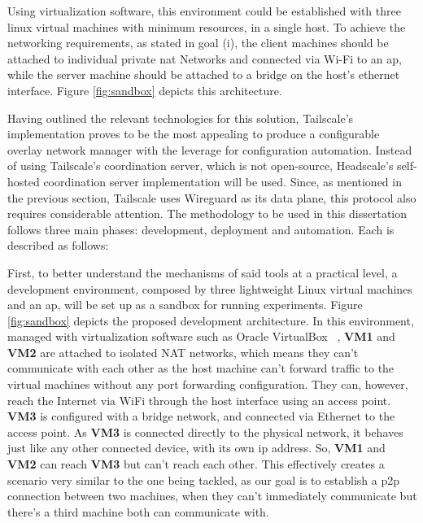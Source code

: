 \documentclass[11pt,twoside,a4paper]{report}
\begin{document}
Using virtualization software, this environment could be established with three linux virtual machines with minimum resources, in a single host. To achieve the networking requirements, as stated in goal (i), the client machines should be attached to individual private \ac{nat} Networks and connected via Wi-Fi to an \ac{ap}, while the server machine should be attached to a bridge on the host's ethernet interface. Figure \ref{fig:sandbox} depicts this architecture.



Having outlined the relevant technologies for this solution, Tailscale's implementation proves to be the most appealing to produce a configurable overlay network manager with the leverage for configuration automation. Instead of using Tailscale's coordination server, which is not open-source, Headscale's self-hosted coordination server implementation will be used. Since, as mentioned in the previous section, Tailscale uses Wireguard as its data plane, this protocol also requires considerable attention. The methodology to be used in this dissertation follows three main phases: development, deployment and automation. Each is described as follows:

First, to better understand the mechanisms of said tools at a practical level, a development environment, composed by three lightweight Linux virtual machines and an \ac{ap}, will be set up as a sandbox for running experiments. Figure \ref{fig:sandbox} depicts the proposed development architecture. In this environment, managed with virtualization software such as Oracle VirtualBox ~\cite{virtualbox}, \textbf{VM1} and \textbf{VM2} are attached to isolated NAT networks, which means they can't communicate with each other as the host machine can't forward traffic to the virtual machines without any port forwarding configuration. They can, however, reach the Internet via WiFi through the host interface using an access point. \textbf{VM3} is configured with a bridge network, and connected via Ethernet to the access point. As \textbf{VM3} is connected directly to the physical network, it behaves just like any other connected device, with its own \ac{ip} address. So, \textbf{VM1} and \textbf{VM2} can reach \textbf{VM3} but can't reach each other. This effectively creates a scenario very similar to the one being tackled, as our goal is to establish a \ac{p2p} connection between two machines, when they can't immediately communicate but there's a third machine both can communicate with.
\end{document}
